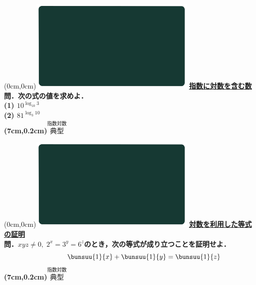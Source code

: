 \documentclass[10pt,
fleqn,
dvipdfmx,
uplatex
]{jsarticle}
\begin{document}
\newpage



\at(0cm,0cm){\includegraphics[width=8cm,bb=0 0 1920 1080]{./media_local/smart_background/指数対数.jpeg}}
{\color{orange}\bf\boldmath\Large\underline{指数に対数を含む数}}\vspace{0.3zw}\\
\LARGE
\bf\boldmath 問．次の式の値を求めよ．\vspace{0.3zw}\\
(1)  ${10}^{\log _{{10}}3}$\\
(2)  ${81}^{\log _3{10}}$\\

\at(7cm,0.2cm){\small\color{bradorange}$\overset{\text{指数対数}}{\text{典型}}$}


\newpage



\at(0cm,0cm){\includegraphics[width=8cm,bb=0 0 1920 1080]{./media_local/smart_background/指数対数.jpeg}}
{\color{orange}\bf\boldmath\Large\underline{対数を利用した等式の証明}}\vspace{0.3zw}\\
\Large 
\bf\boldmath 問．$xyz\neq 0,\;2^x=3^y=6^z$のとき，次の等式が成り立つことを証明せよ．\vspace{-0.5cm}
\[\hspace{1.5cm}\bunsuu{1}{x}+\bunsuu{1}{y}=\bunsuu{1}{z}\]
\at(7cm,0.2cm){\small\color{bradorange}$\overset{\text{指数対数}}{\text{典型}}$}


\newpage
\end{document}
